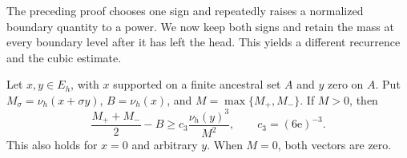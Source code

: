 The preceding proof chooses one sign and repeatedly raises a
normalized boundary quantity to a power.  We now keep both signs
and retain the mass at every boundary level after it has left the
head.  This yields a different recurrence and the cubic estimate.

\begin{lemma}\label{var:cubic-component}
Let $x,y\in E_h$, with $x$ supported on a finite ancestral set $A$
and $y$ zero on $A$.  Put
$M_\sigma=\nu_h(x+\sigma y)$, $B=\nu_h(x)$, and
$M=\max\{M_+,M_-\}$.  If $M>0$, then
\begin{equation}\label{var:cubic-component-eq}
 \frac{M_++M_-}{2}-B
 \ge c_3\frac{\nu_h(y)^3}{M^2},\qquad c_3=(6\mathrm e)^{-3}.
\end{equation}
This also holds for $x=0$ and arbitrary $y$.  When $M=0$, both
vectors are zero.
\end{lemma}

